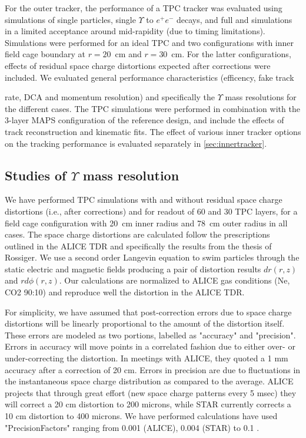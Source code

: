 For the outer tracker, the performance of a TPC tracker was evaluated using \geant simulations of single particles, single $\Upsilon$ to $e^+ e^-$
decays, and full \hijing and \geant simulations in a limited acceptance around mid-rapidity (due to timing limitations). Simulations were performed
for an ideal TPC and two configurations with inner field cage boundary at $r=20$~cm and $r=30$~cm. For the latter configurations, effects of 
residual space charge distortions expected after corrections were included. We evaluated general performance characteristics (efficency, fake track

rate, DCA and momentum resolution) and specifically the $\Upsilon$ mass resolutions for the different cases. The TPC simulations were performed
in combination with the 3-layer MAPS configuration of the reference design, and include the effects of track reconstruction and kinematic fits. 
The effect of various inner tracker options on the tracking performance is evaluated separately in \ref{sec:innertracker}.

\subsection{Studies of $\Upsilon$ mass resolution}

We have performed TPC simulations with and without residual space charge distortions
(i.e., after corrections)  and for readout of 60 and 30 TPC layers, for a field cage configuration with 20~cm inner radius and 78~cm outer radius 
in all cases. The space charge distortions are calculated follow the prescriptions outlined in the ALICE TDR and 
specifically the results from the thesis of Rossiger.  We use a second order Langevin equation to 
swim particles through the static electric and magnetic fields producing a pair of distortion results $dr(r,z)$ and $rd{\phi}(r,z)$.  
Our calculations are normalized to ALICE gas conditions (Ne, CO2 90:10) and reproduce well the distortion in the ALICE TDR.  

For simplicity, we have assumed that post-correction errors due to space charge distortions will be linearly proportional to the amount of the 
distortion itself.  These errors are modeled as two portions, labelled as "accuracy" and "precision".  Errors in accuracy will move points 
in a correlated fashion due to either over- or under-correcting the distortion.  In meetings with ALICE, they quoted a 1 mm accuracy 
after a correction of 20 cm.  Errors in precision are due to fluctuations in the instantaneous space charge distribution as compared to the average.  
ALICE projects that through great effort (new space charge patterns every 5 msec) they will correct a 20 cm distortion to 200 microns,
 while STAR currently corrects a 10 cm distortion to 400 microns.  We have performed calculations have used "PrecisionFactors" ranging 
from  0.001 (ALICE), 0.004 (STAR) to 0.1 .

